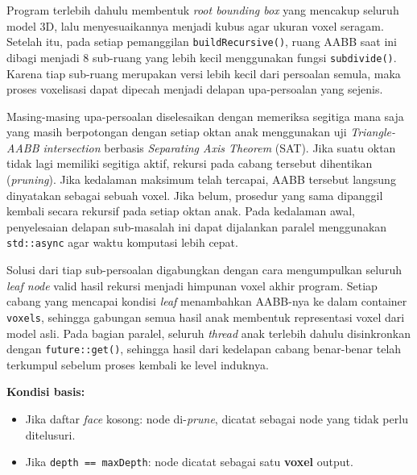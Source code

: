 \documentclass[12pt, a4paper]{report}
\begin{document}
\begin{description}[leftmargin=2.5cm, labelwidth=2cm]
\item[\textbf{DIVIDE}]
    Program terlebih dahulu membentuk \textit{root bounding box} yang
    mencakup seluruh model 3D, lalu menyesuaikannya menjadi kubus agar
    ukuran voxel seragam. Setelah itu, pada setiap pemanggilan
    \texttt{buildRecursive()}, ruang AABB saat ini dibagi menjadi 8
    sub-ruang yang lebih kecil menggunakan fungsi \texttt{subdivide()}.
    Karena tiap sub-ruang merupakan versi lebih kecil dari persoalan
    semula, maka proses voxelisasi dapat dipecah menjadi delapan
    upa-persoalan yang sejenis.

\item[\textbf{CONQUER}]
    Masing-masing upa-persoalan diselesaikan dengan memeriksa segitiga
    mana saja yang masih berpotongan dengan setiap oktan anak menggunakan
    uji \textit{Triangle-AABB intersection} berbasis
    \textit{Separating Axis Theorem} (SAT). Jika suatu oktan tidak lagi
    memiliki segitiga aktif, rekursi pada cabang tersebut dihentikan
    (\textit{pruning}). Jika kedalaman maksimum telah tercapai, AABB
    tersebut langsung dinyatakan sebagai sebuah voxel. Jika belum,
    prosedur yang sama dipanggil kembali secara rekursif pada setiap
    oktan anak. Pada kedalaman awal, penyelesaian delapan sub-masalah ini
    dapat dijalankan paralel menggunakan \texttt{std::async} agar waktu
    komputasi lebih cepat.

\item[\textbf{COMBINE}]
    Solusi dari tiap sub-persoalan digabungkan dengan cara mengumpulkan
    seluruh \textit{leaf node} valid hasil rekursi menjadi himpunan voxel
    akhir program. Setiap cabang yang mencapai kondisi \textit{leaf}
    menambahkan AABB-nya ke dalam container \texttt{voxels}, sehingga
    gabungan semua hasil anak membentuk representasi voxel dari model
    asli. Pada bagian paralel, seluruh \textit{thread} anak terlebih
    dahulu disinkronkan dengan \texttt{future::get()}, sehingga hasil
    dari kedelapan cabang benar-benar telah terkumpul sebelum proses
    kembali ke level induknya.
\end{description}

\textbf{Kondisi basis:}
\begin{itemize}
  \item Jika daftar \textit{face} kosong: node di-\textit{prune},
        dicatat sebagai node yang tidak perlu ditelusuri.
  \item Jika \texttt{depth == maxDepth}: node dicatat sebagai
        satu \textbf{voxel} output.
\end{itemize}
\end{document}
